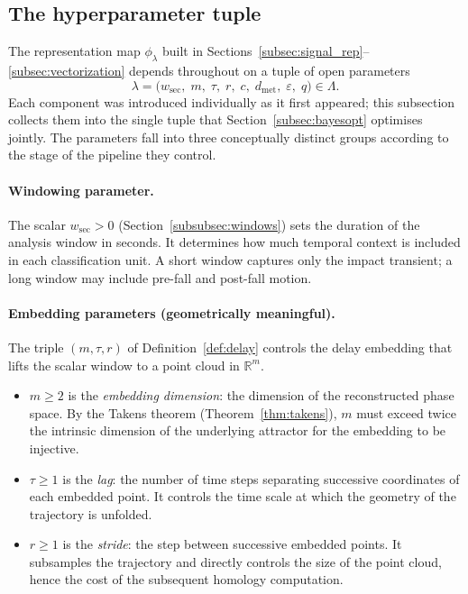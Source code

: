 \documentclass[onluarkali,ingilizce,yukseklisans,karton,LisansustuEgitim]{itutez}
\providecommand{\R}{\mathbb{R}}
\providecommand{\1}{\mathbf{1}}
\begin{document}
\subsection{The hyperparameter tuple}
\label{subsubsec:lambda}

The representation map $\phi_\lambda$ built in Sections~\ref{subsec:signal_rep}--\ref{subsec:vectorization} depends throughout on a tuple of open parameters
\begin{equation}
  \lambda=\bigl(w_{\mathrm{sec}},\;m,\;\tau,\;r,\;c,\;d_{\mathrm{met}},\;\varepsilon,\;q\bigr)\in\Lambda.
  \label{eq:lambda}
\end{equation}
Each component was introduced individually as it first appeared; this subsection collects them into the single tuple that Section~\ref{subsec:bayesopt} optimises jointly. The parameters fall into three conceptually distinct groups according to the stage of the pipeline they control.

\paragraph{Windowing parameter.} The scalar $w_{\mathrm{sec}}>0$ (Section~\ref{subsubsec:windows}) sets the duration of the analysis window in seconds. It determines how much temporal context is included in each classification unit. A short window captures only the impact transient; a long window may include pre-fall and post-fall motion.

\paragraph{Embedding parameters (geometrically meaningful).} The triple $(m,\tau,r)$ of Definition~\ref{def:delay} controls the delay embedding that lifts the scalar window to a point cloud in $\R^m$.
\begin{itemize}[leftmargin=1.5em]
  \item $m\geq 2$ is the \emph{embedding dimension}: the dimension of the reconstructed phase space. By the Takens theorem (Theorem~\ref{thm:takens}), $m$ must exceed twice the intrinsic dimension of the underlying attractor for the embedding to be injective.
  \item $\tau\geq 1$ is the \emph{lag}: the number of time steps separating successive coordinates of each embedded point. It controls the time scale at which the geometry of the trajectory is unfolded.
  \item $r\geq 1$ is the \emph{stride}: the step between successive embedded points. It subsamples the trajectory and directly controls the size of the point cloud, hence the cost of the subsequent homology computation.
\end{itemize}
\end{document}
